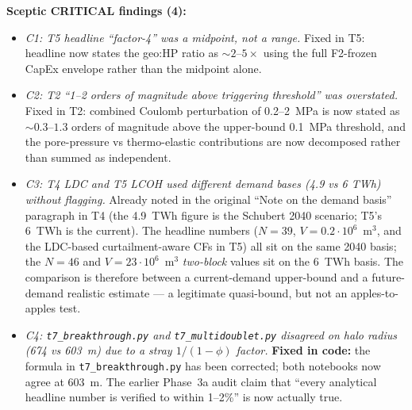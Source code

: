 \documentclass{article}
\begin{document}
\textbf{Sceptic CRITICAL findings (4):}
\begin{itemize}
\item \emph{C1: T5 headline ``factor-4'' was a midpoint, not a range.}
Fixed in T5: headline now states the geo:HP ratio as $\sim 2$--$5\times$
using the full F2-frozen CapEx envelope rather than the midpoint
alone.
\item \emph{C2: T2 ``1--2 orders of magnitude above triggering
threshold'' was overstated.} Fixed in T2: combined Coulomb perturbation
of 0.2--2~MPa is now stated as $\sim 0.3$--$1.3$ orders of magnitude
above the upper-bound 0.1~MPa threshold, and the pore-pressure vs
thermo-elastic contributions are now decomposed rather than summed
as independent.
\item \emph{C3: T4 LDC and T5 LCOH used different demand bases
(4.9 vs 6 TWh) without flagging.} Already noted in the original
``Note on the demand basis'' paragraph in T4 (the 4.9~TWh figure is
the Schubert 2040 scenario; T5's 6~TWh is the current). The headline
numbers ($N=39$, $V=0.2 \cdot 10^{6}$~m$^3$, and the LDC-based
curtailment-aware CFs in T5) all sit on the same 2040 basis; the
$N=46$ and $V=23 \cdot 10^{6}$~m$^3$ \emph{two-block} values sit on
the 6~TWh basis. The comparison is therefore between a current-demand
upper-bound and a future-demand realistic estimate --- a legitimate
quasi-bound, but not an apples-to-apples test.
\item \emph{C4: \texttt{t7\_breakthrough.py} and \texttt{t7\_multidoublet.py}
disagreed on halo radius (674 vs 603~m) due to a stray $1/(1-\phi)$
factor.} \textbf{Fixed in code:} the formula in
\texttt{t7\_breakthrough.py} has been corrected; both notebooks now
agree at 603~m. The earlier Phase~3a audit claim that ``every
analytical headline number is verified to within 1--2\%'' is now
actually true.
\end{itemize}
\end{document}
